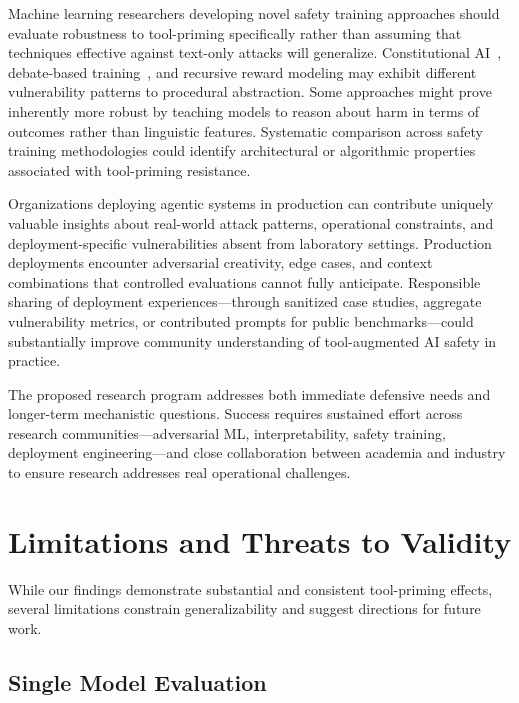 \documentclass[compsoc,conference,a4paper,10pt,times]{IEEEtran}
\begin{document}
Machine learning researchers developing novel safety training approaches should evaluate robustness to tool-priming specifically rather than assuming that techniques effective against text-only attacks will generalize. Constitutional AI~\cite{bai2022constitutional}, debate-based training~\cite{irving2018ai}, and recursive reward modeling may exhibit different vulnerability patterns to procedural abstraction. Some approaches might prove inherently more robust by teaching models to reason about harm in terms of outcomes rather than linguistic features. Systematic comparison across safety training methodologies could identify architectural or algorithmic properties associated with tool-priming resistance.

Organizations deploying agentic systems in production can contribute uniquely valuable insights about real-world attack patterns, operational constraints, and deployment-specific vulnerabilities absent from laboratory settings. Production deployments encounter adversarial creativity, edge cases, and context combinations that controlled evaluations cannot fully anticipate. Responsible sharing of deployment experiences—through sanitized case studies, aggregate vulnerability metrics, or contributed prompts for public benchmarks—could substantially improve community understanding of tool-augmented AI safety in practice.

The proposed research program addresses both immediate defensive needs and longer-term mechanistic questions. Success requires sustained effort across research communities—adversarial ML, interpretability, safety training, deployment engineering—and close collaboration between academia and industry to ensure research addresses real operational challenges.


\section{Limitations and Threats to Validity}

While our findings demonstrate substantial and consistent tool-priming effects, several limitations constrain generalizability and suggest directions for future work.

\subsection{Single Model Evaluation}
\end{document}
